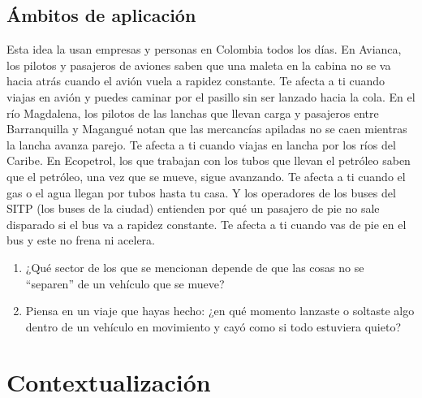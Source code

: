\documentclass[
  spanish,
  letterpaper,
  12pt,
  oneside,
  open=any,
  DIV=15]{scrbook}
\providecommand{\tightlist}{%
  \setlength{\itemsep}{0pt}\setlength{\parskip}{0pt}}
\newcommand{\setcolorsection}[2]{%
  \definecolor{currentsectionbg}{HTML}{#1}%
  \definecolor{currentsectionborder}{HTML}{#2}%
}
\begin{document}
\subsection{Ámbitos de aplicación}\label{uxe1mbitos-de-aplicaciuxf3n-6}

Esta idea la usan empresas y personas en Colombia todos los días. En
Avianca, los pilotos y pasajeros de aviones saben que una maleta en la
cabina no se va hacia atrás cuando el avión vuela a rapidez constante.
Te afecta a ti cuando viajas en avión y puedes caminar por el pasillo
sin ser lanzado hacia la cola. En el río Magdalena, los pilotos de las
lanchas que llevan carga y pasajeros entre Barranquilla y Magangué notan
que las mercancías apiladas no se caen mientras la lancha avanza parejo.
Te afecta a ti cuando viajas en lancha por los ríos del Caribe. En
Ecopetrol, los que trabajan con los tubos que llevan el petróleo saben
que el petróleo, una vez que se mueve, sigue avanzando. Te afecta a ti
cuando el gas o el agua llegan por tubos hasta tu casa. Y los operadores
de los buses del SITP (los buses de la ciudad) entienden por qué un
pasajero de pie no sale disparado si el bus va a rapidez constante. Te
afecta a ti cuando vas de pie en el bus y este no frena ni acelera.

\begin{tcolorbox}[enhanced jigsaw, arc=.35mm, bottomrule=.15mm, bottomtitle=1mm, breakable, colback=white, colbacktitle=quarto-callout-note-color!10!white, colframe=quarto-callout-note-color-frame, coltitle=black, left=2mm, leftrule=.75mm, opacityback=0, opacitybacktitle=0.6, rightrule=.15mm, title=\textcolor{quarto-callout-note-color}{\faInfo}\hspace{0.5em}{Conexión con el Mundo Real}, titlerule=0mm, toprule=.15mm, toptitle=1mm]

\begin{enumerate}
\def\labelenumi{\arabic{enumi}.}
\tightlist
\item
  ¿Qué sector de los que se mencionan depende de que las cosas no se
  ``separen'' de un vehículo que se mueve?
\item
  Piensa en un viaje que hayas hecho: ¿en qué momento lanzaste o
  soltaste algo dentro de un vehículo en movimiento y cayó como si todo
  estuviera quieto?
\end{enumerate}

\end{tcolorbox}

\setcolorsection{f2c6a0}{e0b088}

\section{Contextualización}\label{contextualizaciuxf3n-6}
\end{document}
